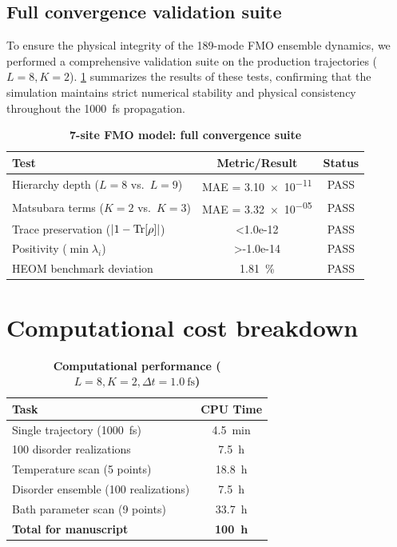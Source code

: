 \documentclass[11pt,a4paper]{article}
\begin{document}
\subsection{Full convergence validation suite}

To ensure the physical integrity of the 189-mode FMO ensemble dynamics, we performed a comprehensive validation suite on the production trajectories ($L=8, K=2$). \cref{tab:SI_7site_convergence} summarizes the results of these tests, confirming that the simulation maintains strict numerical stability and physical consistency throughout the \SI{1000}{\femto\second} propagation.

\begin{table}[h]
\centering
\caption{\textbf{7-site FMO model: full convergence suite}}
\label{tab:SI_7site_convergence}
\begin{tabular}{lcc}
\toprule
\textbf{Test} & \textbf{Metric/Result} & \textbf{Status} \\
\midrule
Hierarchy depth ($L=8$ vs.\ $L=9$) & MAE = \num{3.10e-11} & PASS \\
Matsubara terms ($K=2$ vs.\ $K=3$) & MAE = \num{3.32e-05} & PASS \\
Trace preservation ($\abs{1 - \Tr[\rho]}$) & \num{<1.0e-12} & PASS \\
Positivity ($\min \lambda_i$) & \num{>-1.0e-14} & PASS \\
HEOM benchmark deviation & \SI{1.81}{\percent} & PASS \\
\bottomrule
\end{tabular}
\end{table}


\section{Computational cost breakdown}
\label{sec:S5}

\begin{table}[htb]
\centering
\caption{\textbf{Computational performance ($L=8, K=2, \Delta t=\SI{1.0}{\femto\second}$)}}
\label{tab:SI_performance}
\begin{tabular}{lc}
\toprule
\textbf{Task} & \textbf{CPU Time} \\
\midrule
Single trajectory (\SI{1000}{\femto\second}) & \SI{4.5}{\minute} \\
100 disorder realizations & \SI{7.5}{\hour} \\
Temperature scan (5 points) & \SI{18.8}{\hour} \\
Disorder ensemble (100 realizations) & \SI{7.5}{\hour} \\
Bath parameter scan (9 points) & \SI{33.7}{\hour} \\
\midrule
\textbf{Total for manuscript} & \textbf{\SI{100}{\hour}} \\
\bottomrule
\end{tabular}
\end{table}
\end{document}
